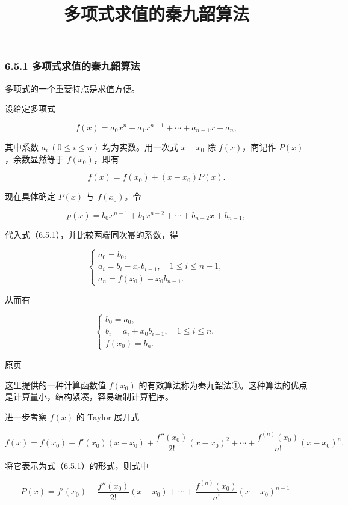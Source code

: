 \documentclass[
  10pt,
  fontset=fandol]{ctexart}
\title{多项式求值的秦九韶算法}
\author{}
\date{}
\begin{document}
\maketitle

\subsubsection{6.5.1 多项式求值的秦九韶算法}\label{ux591aux9879ux5f0fux6c42ux503cux7684ux79e6ux4e5dux97f6ux7b97ux6cd5}

多项式的一个重要特点是求值方便。

设给定多项式

\[
f(x)=a_0x^n+a_1x^{n-1}+\cdots+a_{n-1}x+a_n,
\]

其中系数 \(a_i\ (0\leqslant i\leqslant n)\) 均为实数。用一次式 \(x-x_0\) 除 \(f(x)\)，商记作 \(P(x)\)，余数显然等于 \(f(x_0)\)，即有

\[
f(x)=f(x_0)+(x-x_0)P(x).
\tag{6.5.1}
\]

现在具体确定 \(P(x)\) 与 \(f(x_0)\)。令

\[
p(x)=b_0x^{n-1}+b_1x^{n-2}+\cdots+b_{n-2}x+b_{n-1},
\]

代入式（6.5.1），并比较两端同次幂的系数，得

\[
\begin{cases}
a_0=b_0,\\
a_i=b_i-x_0b_{i-1},\quad1\leqslant i\leqslant n-1,\\
a_n=f(x_0)-x_0b_{n-1}.
\end{cases}
\]

从而有

\[
\begin{cases}
b_0=a_0,\\
b_i=a_i+x_0b_{i-1},\quad1\leqslant i\leqslant n,\\
f(x_0)=b_n.
\end{cases}
\tag{6.5.2}
\]

\href{../../source-images/pdf-172.jpeg}{原页}

这里提供的一种计算函数值 \(f(x_0)\) 的有效算法称为秦九韶法①。这种算法的优点是计算量小，结构紧凑，容易编制计算程序。

进一步考察 \(f(x)\) 的 Taylor 展开式

\[
f(x)=f(x_0)+f'(x_0)(x-x_0)+\frac{f''(x_0)}{2!}(x-x_0)^2+\cdots+\frac{f^{(n)}(x_0)}{n!}(x-x_0)^n.
\]

将它表示为式（6.5.1）的形式，则式中

\[
P(x)=f'(x_0)+\frac{f''(x_0)}{2!}(x-x_0)+\cdots+\frac{f^{(n)}(x_0)}{n!}(x-x_0)^{n-1}.
\]
\end{document}
